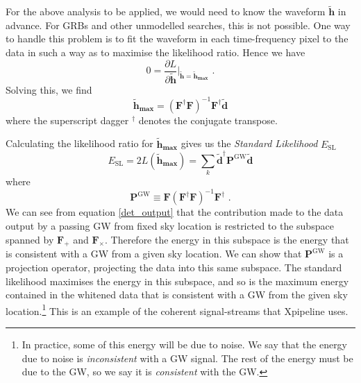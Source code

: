 \documentclass[12pt,twoside,a4paper]{report}
\newcommand{\fs}{\text{ .}}
\newcommand{\tbd}{\tilde{\textbf{d}}}
\newcommand{\tbh}{\tilde{\textbf{h}}}
\begin{document}
For the above analysis to be applied, we would need to know the waveform $\tbh$ in advance. For GRBs and other unmodelled searches, this is not possible. One way to handle this problem is to fit the waveform in each time-frequency pixel to the data in such a way as to maximise the likelihood ratio. Hence we have
\begin{equation}
0=\frac{\partial L}{\partial \tbh} \bigg|_{\tbh=\tbh_{\textbf{max}}} \fs
\end{equation} 
Solving this, we find
\begin{equation} 
\tbh_\textbf{max}=(\textbf{F}^\dagger \textbf{F} )^{-1} \textbf{F}^\dagger \tbd
\end{equation}
where the superscript dagger $^\dagger$ denotes the conjugate transpose. 

Calculating the likelihood ratio for $\tbh_\textbf{max}$ gives us the \emph{Standard Likelihood} $E_\text{SL}$
\begin{equation} \label{Esl}
E_\text{SL}=2L(\tbh_\textbf{max} )=\sum_k \tbd^\dagger \textbf{P}^\text{GW} \tbd
\end{equation}
where 
\begin{equation} \label{projOp1}
\textbf{P}^\text{GW} \equiv \textbf{F} (\textbf{F}^\dagger \textbf{F})^{-1} \textbf{F}^\dagger \fs
\end{equation}
We can see from equation \ref{det_output} that the contribution made to the data output by a passing GW from fixed sky location is restricted to the subspace spanned by $\textbf{F}_+$ and $\textbf{F}_\times$. Therefore the energy in this subspace is the energy that is consistent with a GW from a given sky location. We can show that $\textbf{P}^\text{GW} $ is a projection operator, projecting the data into this same subspace. The standard likelihood maximises the energy in this subspace, and so is the maximum energy contained in the whitened data that is consistent with a GW from the given sky location.\footnote{In practice, some of this energy will be due to noise. We say that the energy due to noise is \emph{inconsistent} with a GW signal. The rest of the energy must be due to the GW, so we say it is \emph{consistent} with the GW.} This is an example of the coherent signal-streams that Xpipeline uses.
\end{document}
